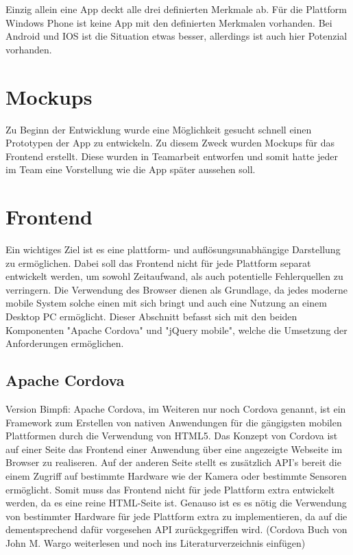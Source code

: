 \documentclass[10pt, conference, compsocconf]{IEEEtran}
\begin{document}
Einzig allein eine App deckt alle drei definierten Merkmale ab. 
Für die Plattform Windows Phone ist keine App mit den definierten Merkmalen vorhanden.
Bei Android und IOS ist die Situation etwas besser, allerdings ist auch hier Potenzial vorhanden.

\section{Mockups}
Zu Beginn der Entwicklung wurde eine Möglichkeit gesucht schnell einen Prototypen der App zu entwickeln.
Zu diesem Zweck wurden Mockups f\"ur das Frontend erstellt. 
Diese wurden in Teamarbeit entworfen und somit hatte jeder im Team eine Vorstellung wie die App sp\"ater aussehen soll.


\section{Frontend}
Ein wichtiges Ziel ist es eine plattform- und aufl\"osungsunabh\"angige Darstellung zu erm\"oglichen. Dabei soll das Frontend nicht f\"ur jede Plattform separat entwickelt werden, um sowohl Zeitaufwand, als auch potentielle Fehlerquellen zu verringern. Die Verwendung des Browser dienen als Grundlage, da jedes moderne mobile System solche einen mit sich bringt und auch eine Nutzung an einem Desktop PC erm\"oglicht. Dieser Abschnitt befasst sich mit den beiden Komponenten "Apache Cordova" und "jQuery mobile", welche die Umsetzung der Anforderungen erm\"oglichen.

\subsection{Apache Cordova}
Version Bimpfi:
Apache Cordova, im Weiteren nur noch Cordova genannt, ist ein Framework zum Erstellen von nativen Anwendungen f\"ur die g\"angigsten mobilen Plattformen durch die Verwendung von HTML5. Das Konzept von Cordova ist auf einer Seite das Frontend einer Anwendung \"uber eine angezeigte Webseite im Browser zu realiseren. Auf der anderen Seite stellt es zus\"atzlich API's bereit die einem Zugriff auf bestimmte Hardware wie der Kamera oder bestimmte Sensoren erm\"oglicht. Somit muss das Frontend nicht f\"ur jede Plattform extra entwickelt werden, da es eine reine HTML-Seite ist. Genauso ist es es n\"otig die Verwendung von bestimmter Hardware f\"ur jede Plattform extra zu implementieren, da auf die dementsprechend daf\"ur vorgesehen API zur\"uckgegriffen wird. (Cordova Buch von John M. Wargo weiterlesen und noch ins Literaturverzeichnis einf\"ugen)
\end{document}
